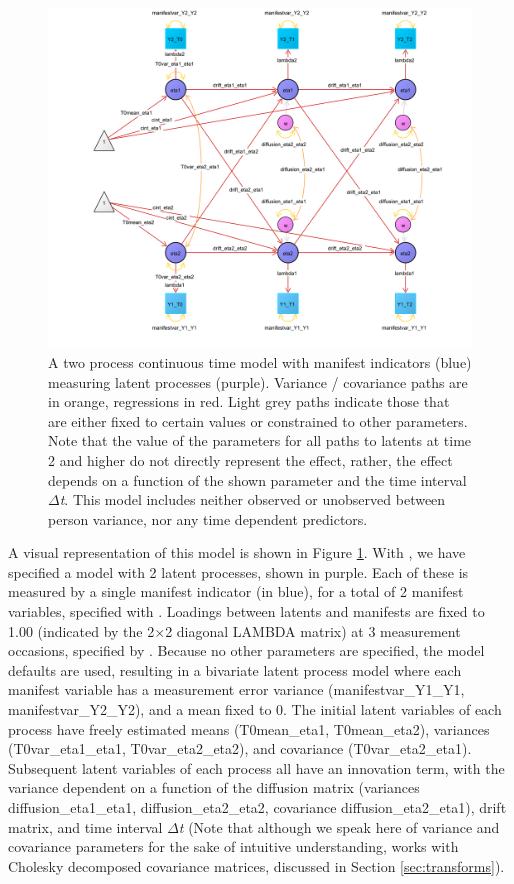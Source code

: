 \documentclass[nojss]{jss}\usepackage[]{graphicx}\usepackage[]{color}
\begin{document}
\begin{figure}[!p]
\includegraphics[width = \textwidth]{pathdiagramtwoprocessbasic}
\caption{ \label{fig:pathdiagramtwoprocessbasic} A two process continuous time model with manifest indicators (blue) measuring latent processes (purple). Variance / covariance paths are in orange, regressions in red. Light grey paths indicate those that are either fixed to certain values or constrained to other parameters. Note that the value of the parameters for all paths to latents at time 2 and higher do not directly represent the effect, rather, the effect depends on a function of the shown parameter and the time interval $\Delta$\textit{t}. This model includes neither observed or unobserved between person variance, nor any time dependent predictors.  }
\end{figure}
A visual representation of this model is shown in Figure \ref{fig:pathdiagramtwoprocessbasic}. With , we have specified a model with 2 latent processes, shown in purple. Each of these is measured by a single manifest indicator (in blue), for a total of 2 manifest variables, specified with . Loadings between latents and manifests are fixed to 1.00 (indicated by the 2$\times$2 diagonal LAMBDA matrix) at 3 measurement occasions, specified by . Because no other parameters are specified, the model defaults are used, resulting in a bivariate latent process model where each manifest variable has a measurement error variance (manifestvar\_Y1\_Y1, manifestvar\_Y2\_Y2), and a mean fixed to 0. The initial latent variables of each process have freely estimated means (T0mean\_eta1, T0mean\_eta2), variances (T0var\_eta1\_eta1, T0var\_eta2\_eta2), and covariance (T0var\_eta2\_eta1). Subsequent latent variables of each process all have an innovation term, with the variance dependent on a function of the diffusion matrix (variances diffusion\_eta1\_eta1, diffusion\_eta2\_eta2, covariance diffusion\_eta2\_eta1), drift matrix, and time interval $\Delta$\textit{t} (Note that although we speak here of variance and covariance parameters for the sake of intuitive understanding,  works with Cholesky decomposed covariance matrices, discussed in Section \ref{sec:transforms}).
\end{document}
